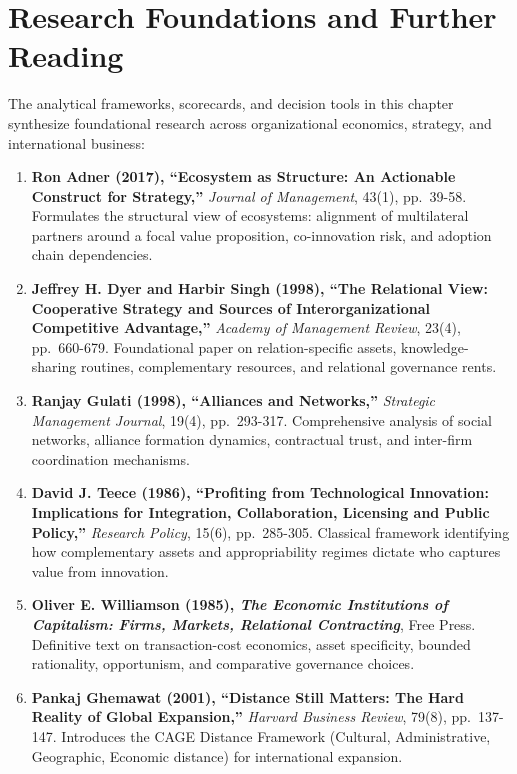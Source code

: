 \section*{Research Foundations and Further Reading}
\label{sec:ch30_research_foundations}

The analytical frameworks, scorecards, and decision tools in this chapter synthesize foundational research across organizational economics, strategy, and international business:

\begin{enumerate}
\item \textbf{Ron Adner (2017), ``Ecosystem as Structure: An Actionable Construct for Strategy,''} \textit{Journal of Management}, 43(1), pp.~39-58. Formulates the structural view of ecosystems: alignment of multilateral partners around a focal value proposition, co-innovation risk, and adoption chain dependencies.
\item \textbf{Jeffrey H. Dyer and Harbir Singh (1998), ``The Relational View: Cooperative Strategy and Sources of Interorganizational Competitive Advantage,''} \textit{Academy of Management Review}, 23(4), pp.~660-679. Foundational paper on relation-specific assets, knowledge-sharing routines, complementary resources, and relational governance rents.
\item \textbf{Ranjay Gulati (1998), ``Alliances and Networks,''} \textit{Strategic Management Journal}, 19(4), pp.~293-317. Comprehensive analysis of social networks, alliance formation dynamics, contractual trust, and inter-firm coordination mechanisms.
\item \textbf{David J. Teece (1986), ``Profiting from Technological Innovation: Implications for Integration, Collaboration, Licensing and Public Policy,''} \textit{Research Policy}, 15(6), pp.~285-305. Classical framework identifying how complementary assets and appropriability regimes dictate who captures value from innovation.
\item \textbf{Oliver E. Williamson (1985), \textit{The Economic Institutions of Capitalism: Firms, Markets, Relational Contracting}}, Free Press. Definitive text on transaction-cost economics, asset specificity, bounded rationality, opportunism, and comparative governance choices.
\item \textbf{Pankaj Ghemawat (2001), ``Distance Still Matters: The Hard Reality of Global Expansion,''} \textit{Harvard Business Review}, 79(8), pp.~137-147. Introduces the CAGE Distance Framework (Cultural, Administrative, Geographic, Economic distance) for international expansion.

\end{enumerate}
